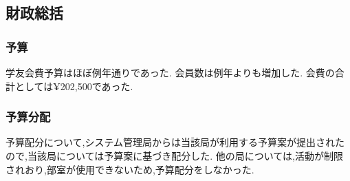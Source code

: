 \subsection*{財政総括}


\subsubsection*{予算}
学友会費予算はほぼ例年通りであった.
会員数は例年よりも増加した. 
会費の合計としては¥202,500であった.

\subsubsection*{予算分配}
予算配分について,システム管理局からは当該局が利用する予算案が提出されたので,当該局については予算案に基づき配分した.
他の局については,活動が制限されおり,部室が使用できないため,予算配分をしなかった.
